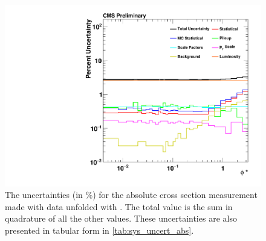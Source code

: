 \begin{figure}[!p]
    \centering
    \includegraphics[width=\textwidth]{figures/data_uncertainty_absolute.pdf}
    \caption[
        The uncertainties for the absolute cross section measurement made with
        data unfolded with \MADGRAPH.
    ]{
        The uncertainties (in \%) for the absolute cross section measurement
        made with data unfolded with \MADGRAPH. The total value is the sum in
        quadrature of all the other values. These uncertainties are also
        presented in tabular form in \cref{tab:sys_uncert_abs}.
    }
    \label{fig:sys_uncert_abs}
\end{figure}
